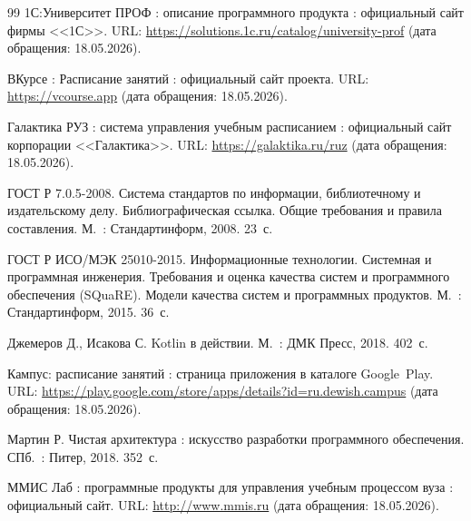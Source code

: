 %
%


\begin{thebibliography}{99}
   1С:Университет ПРОФ : описание программного продукта : официальный сайт фирмы <<1С>>. URL: \url{https://solutions.1c.ru/catalog/university-prof} (дата обращения: 18.05.2026).

   ВКурсе : Расписание занятий : официальный сайт проекта. URL: \url{https://vcourse.app} (дата обращения: 18.05.2026).

   Галактика РУЗ : система управления учебным расписанием : официальный сайт корпорации <<Галактика>>. URL: \url{https://galaktika.ru/ruz} (дата обращения: 18.05.2026).

   ГОСТ Р 7.0.5-2008. Система стандартов по информации, библиотечному и издательскому делу. Библиографическая ссылка. Общие требования и правила составления. М.~: Стандартинформ, 2008. 23~с.

   ГОСТ Р ИСО/МЭК 25010-2015. Информационные технологии. Системная и программная инженерия. Требования и оценка качества систем и программного обеспечения (SQuaRE). Модели качества систем и программных продуктов. М.~: Стандартинформ, 2015. 36~с.

   Джемеров Д., Исакова С. Kotlin в действии. М.~: ДМК Пресс, 2018. 402~с.

   Кампус: расписание занятий : страница приложения в каталоге Google~Play. URL: \url{https://play.google.com/store/apps/details?id=ru.dewish.campus} (дата обращения: 18.05.2026).

   Мартин Р. Чистая архитектура : искусство разработки программного обеспечения. СПб.~: Питер, 2018. 352~с.

   ММИС Лаб : программные продукты для управления учебным процессом вуза : официальный сайт. URL: \url{http://www.mmis.ru} (дата обращения: 18.05.2026).


\end{thebibliography}
